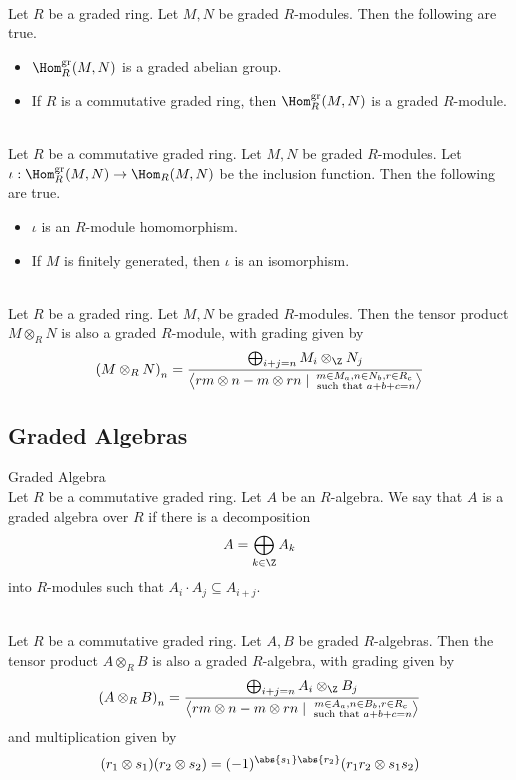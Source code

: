 \documentclass[a4paper]{article}
\begin{document}
\begin{prp}{}{}\\
Let $R$ be a graded ring. Let $M,N$ be graded $R$-modules. Then the following are true. 
\begin{itemize}
\item $\Hom_R^\text{gr}(M,N)$ is a graded abelian group. 
\item If $R$ is a commutative graded ring, then $\Hom_R^\text{gr}(M,N)$ is a graded $R$-module. 
\end{itemize}
\end{prp}

\begin{prp}{}{}\\
Let $R$ be a commutative graded ring. Let $M,N$ be graded $R$-modules. Let $\iota:\Hom_R^\text{gr}(M,N)\to\Hom_R(M,N)$ be the inclusion function. Then the following are true. 
\begin{itemize}
\item $\iota$ is an $R$-module homomorphism. 
\item If $M$ is finitely generated, then $\iota$ is an isomorphism. 
\end{itemize}
\end{prp}

\begin{prp}{}{}\\
Let $R$ be a graded ring. Let $M,N$ be graded $R$-modules. Then the tensor product $M\otimes_RN$ is also a graded $R$-module, with grading given by $$\left(M\otimes_RN\right)_n=\frac{\bigoplus_{i+j=n}M_i\otimes_\Z N_j}{\left\langle rm\otimes n-m\otimes rn\;|\;\substack{m\in M_a, n\in N_b, r\in R_c\\\text{ such that }a+b+c=n}\right\rangle}$$
\end{prp}

\subsection{Graded Algebras}
\begin{defn}{Graded Algebra}{}\\
Let $R$ be a commutative graded ring. Let $A$ be an $R$-algebra. We say that $A$ is a graded algebra over $R$ if there is a decomposition $$A=\bigoplus_{k\in\Z}A_k$$ into $R$-modules such that $A_i\cdot A_j\subseteq A_{i+j}$. 
\end{defn}

\begin{prp}{}{}\\
Let $R$ be a commutative graded ring. Let $A,B$ be graded $R$-algebras. Then the tensor product $A\otimes_RB$ is also a graded $R$-algebra, with grading given by $$\left(A\otimes_RB\right)_n=\frac{\bigoplus_{i+j=n}A_i\otimes_\Z B_j}{\left\langle rm\otimes n-m\otimes rn\;|\;\substack{m\in A_a, n\in B_b, r\in R_c\\\text{ such that }a+b+c=n}\right\rangle}$$ and multiplication given by $$(r_1\otimes s_1)(r_2\otimes s_2)=(-1)^{\abs{s_1}\abs{r_2}}(r_1r_2\otimes s_1s_2)$$
\end{prp}
\end{document}
